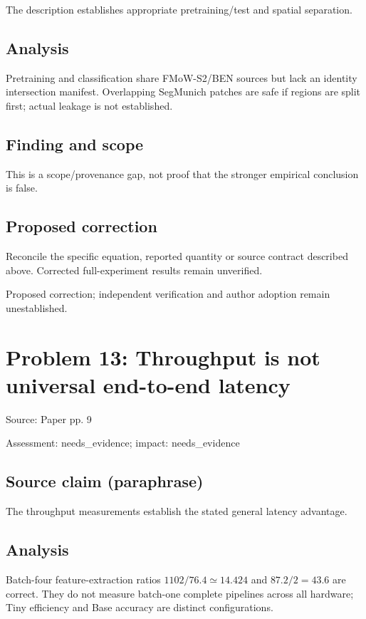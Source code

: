 \documentclass[11pt]{article}
\begin{document}
The description establishes appropriate pretraining/test and spatial separation.

\subsection*{Analysis}

Pretraining and classification share FMoW-S2/BEN sources but lack an identity intersection manifest. Overlapping SegMunich patches are safe if regions are split first; actual leakage is not established.

\subsection*{Finding and scope}

This is a scope/provenance gap, not proof that the stronger empirical conclusion is false.

\subsection*{Proposed correction}

Reconcile the specific equation, reported quantity or source contract described above. Corrected full-experiment results remain unverified.

Proposed correction; independent verification and author adoption remain unestablished.

\section*{Problem 13: Throughput is not universal end-to-end latency}

Source: Paper pp. 9

Assessment: needs\_evidence; impact: needs\_evidence

\subsection*{Source claim (paraphrase)}

The throughput measurements establish the stated general latency advantage.

\subsection*{Analysis}

Batch-four feature-extraction ratios \(1102/76.4\simeq14.424\) and \(87.2/2=43.6\) are correct. They do not measure batch-one complete pipelines across all hardware; Tiny efficiency and Base accuracy are distinct configurations.
\end{document}

